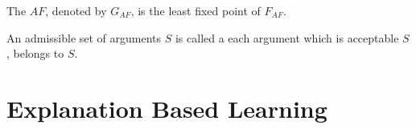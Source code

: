 \begin{defi}
The  $AF$, denoted by $G_{AF}$, is the least fixed point of $F_{AF}$.
\cite{conf/ijcai/Dung93}
\end{defi}

\begin{defi}
An admissible set of arguments $S$ is called a  \iffTx{} each argument which is acceptable \wrtTx{} $S$, belongs to $S$.
\cite{conf/ijcai/Dung93}
\end{defi}

\section{Explanation Based Learning}


